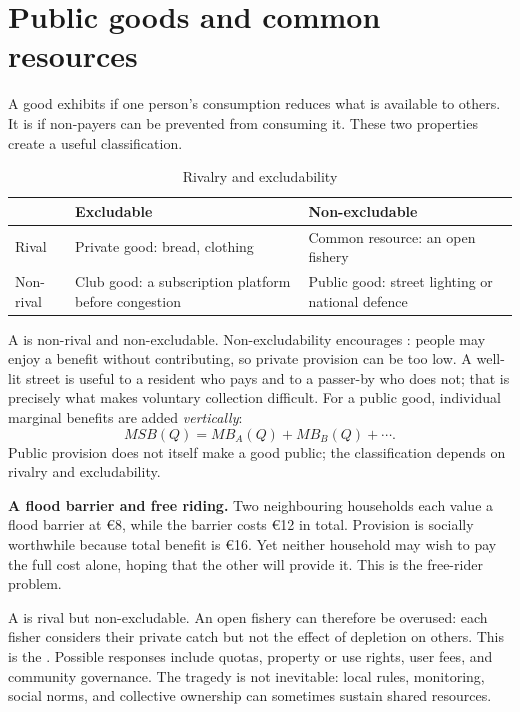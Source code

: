 \section{Public goods and common resources}

A good exhibits  if one person's consumption reduces what is
available to others. It is  if non-payers can be prevented
from consuming it. These two properties create a useful classification.

\begin{table}[htbp]
  \centering
  \caption{Rivalry and excludability}
  \label{tab:goods-classification}
  \begingroup
  \small
  \renewcommand{\arraystretch}{1.18}
  \begin{tabular}{@{}p{2.1cm}p{4.7cm}p{4.7cm}@{}}
    \toprule
     & Excludable & Non-excludable \\
    \midrule
    Rival &
    Private good: bread, clothing &
    Common resource: an open fishery \\
    Non-rival &
    Club good: a subscription platform before congestion &
    Public good: street lighting or national defence \\
    \bottomrule
  \end{tabular}
  \endgroup
\end{table}
\FloatBarrier

A  is non-rival and non-excludable. Non-excludability
encourages : people may enjoy a benefit without
contributing, so private provision can be too low. A well-lit street is useful
to a resident who pays and to a passer-by who does not; that is precisely what
makes voluntary collection difficult. For a public good, individual marginal
benefits are added \emph{vertically}:
\[
MSB(Q)=MB_A(Q)+MB_B(Q)+\cdots.
\]
Public provision does not itself make a good public; the classification depends
on rivalry and excludability.

\begin{exercisebox}
\textbf{A flood barrier and free riding.}
Two neighbouring households each value a flood barrier at \euro8, while the
barrier costs \euro12 in total. Provision is socially worthwhile because total
benefit is \euro16. Yet neither household may wish to pay the full cost alone,
hoping that the other will provide it. This is the free-rider problem.
\end{exercisebox}

A  is rival but non-excludable. An open fishery can
therefore be overused: each fisher considers their private catch but not the
effect of depletion on others. This is the .
Possible responses include quotas, property or use rights, user fees, and
community governance. The tragedy is not inevitable: local rules, monitoring,
social norms, and collective ownership can sometimes sustain shared resources.


